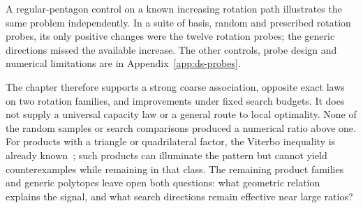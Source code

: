 A regular-pentagon control on a known increasing rotation path illustrates
the same problem independently. In a suite of basis, random and prescribed
rotation probes, its only positive changes were the twelve rotation
probes; the generic directions missed the available increase. The other
controls, probe design and numerical limitations are in
Appendix~\ref{app:ds-probes}.

The chapter therefore supports a strong coarse association, opposite
exact laws on two rotation families, and improvements under fixed search budgets. It does
not supply a universal capacity law or a general route to local optimality.
None of the random samples or search comparisons produced a numerical
ratio above one. For products with a triangle or quadrilateral factor,
the Viterbo inequality is already known~\cite[Theorem~1.2 and Section~4]{dsBMP2026};
such products can illuminate the pattern but cannot yield counterexamples
while remaining in that class. The remaining product families and generic
polytopes leave open both questions: what geometric relation explains the
signal, and what search directions remain effective near large ratios?
